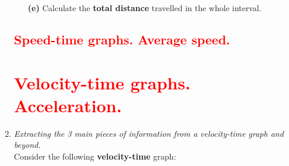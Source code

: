 \documentclass[A4,12pt]{article}
\begin{document}
\begin{enumerate}[label=\bfseries (\arabic*)]
\begin{itemize}
    \item[\bf (e)] Calculate the \textbf{total distance} travelled in the whole interval.
    
\end{itemize}





\subsection*{\textcolor{red}{Speed-time graphs. Average speed.}}




\section*{\textcolor{red}{Velocity-time graphs. Acceleration.}}


\item {\it Extracting the 3 main pieces of information from a velocity-time graph and beyond.}\\

Consider the following \textbf{velocity-time} graph:


\end{enumerate}
\end{document}
